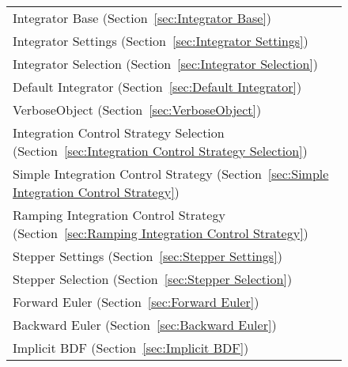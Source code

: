 \begin{figure} 
\centering{} 
  \begin{tabular}{p{}}
\hspace*{0in} Integrator Base (Section~\ref{sec:Integrator Base})
    \index{Integrator Base} \\ 
\hspace*{0.2in} Integrator Settings (Section~\ref{sec:Integrator Settings})
    \index{Integrator Settings} \\ 
\hspace*{0.4in} Integrator Selection (Section~\ref{sec:Integrator Selection})
    \index{Integrator Selection} \\ 
\hspace*{0.6in} Default Integrator (Section~\ref{sec:Default Integrator})
    \index{Default Integrator} \\ 
\hspace*{0.8in} VerboseObject (Section~\ref{sec:VerboseObject})
    \index{VerboseObject} \\ 
\hspace*{0.2in} Integration Control Strategy Selection (Section~\ref{sec:Integration Control Strategy Selection})
    \index{Integration Control Strategy Selection} \\ 
\hspace*{0.4in} Simple Integration Control Strategy (Section~\ref{sec:Simple Integration Control Strategy})
    \index{Simple Integration Control Strategy} \\ 
\hspace*{0.4in} Ramping Integration Control Strategy (Section~\ref{sec:Ramping Integration Control Strategy})
    \index{Ramping Integration Control Strategy} \\ 
\hspace*{0.2in} Stepper Settings (Section~\ref{sec:Stepper Settings})
    \index{Stepper Settings} \\ 
\hspace*{0.4in} Stepper Selection (Section~\ref{sec:Stepper Selection})
    \index{Stepper Selection} \\ 
\hspace*{0.6in} Forward Euler (Section~\ref{sec:Forward Euler})
    \index{Forward Euler} \\ 
\hspace*{0.6in} Backward Euler (Section~\ref{sec:Backward Euler})
    \index{Backward Euler} \\ 
\hspace*{0.6in} Implicit BDF (Section~\ref{sec:Implicit BDF})

\end{tabular}
\end{figure}
